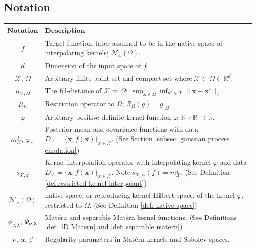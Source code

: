 \documentclass[pdflatex,sn-mathphys-num]{sn-jnl}%
\theoremstyle{thmstyleone}%
\theoremstyle{thmstyletwo}%
\theoremstyle{thmstylethree}%
\begin{document}
\subsection*{Notation}
\renewcommand{\arraystretch}{1.2}
\begin{center}
\begin{longtable}{|c|p{}|}
    \hline
    Notation & Description\\
    \hline
    \(f\) & Target function, later assumed to be in the native space of interpolating kernels; \(\mathcal{N}_\varphi(\Omega)\).\\
    \(d\) & Dimension of the input space of \(f\).\\
    \(\mathcal{X}\), \(\Omega\) & Arbitrary finite point set and compact set where \(\mathcal{X}\subset\Omega\subset\mathbb{R}^d\).\\
    \(h_{\mathcal{X},\Omega}\) & The fill-distance of \(\mathcal{X}\) in \(\Omega\); \(\,\sup_{\mathbf{x}\in\Omega}\inf_{\mathbf{x}'\in\mathcal{X}}\|\mathbf{x}-\mathbf{x}'\|_{2}\).\\
    \(R_\Omega\) & Restriction operator to \(\Omega\); \(R_\Omega(g)=g|_{\Omega}\).\\
    \(\varphi\) & Arbitrary positive definite kernel function \(\varphi:\mathbb{R}\times\mathbb{R}\rightarrow\mathbb{R}\).\\
    \(m_{\mathcal{X}}^f\), \(\varphi_{\mathcal{X}}\) & Posterior mean and covariance functions with data \(D_{\mathcal{X}}=\{\mathbf{x},f(\mathbf{x})\}_{x\in\mathcal{X}}\). (See Section \ref{subsec: gaussian process emulation})\\
    \(s_{\mathcal{X},\varphi}\) & Kernel interpolation operator with interpolating kernel \(\varphi\) and data \(D_{\mathcal{X}}=\{\mathbf{x},f(\mathbf{x})\}_{x\in\mathcal{X}}\). Note \(s_{\mathcal{X},\varphi}(f)=m_{\mathcal{X}}^f\). (See Definition \ref{def:restricted kernel interpolant}) \\
    \(\mathcal{N}_{\varphi}(\Omega)\) & native space, or reproducing kernel Hilbert space, of the kernel \(\varphi\), restricted to \(\Omega\). (See Definition \ref{def: native space})\\
    \(\phi_{\nu,\lambda}\), \(\Phi_{\boldsymbol{\nu},\boldsymbol{\lambda}}\) & Mat\'ern and separable Mat\'ern kernel functions. (See Definitions \ref{def: 1D Matern} and \ref{def: separable matern})\\
    \(\nu\), \(\alpha\), \(\beta\) & Regularity parameters in Mat\'ern kernels and Sobolev spaces.\\

\end{longtable}
\end{center}
\end{document}
